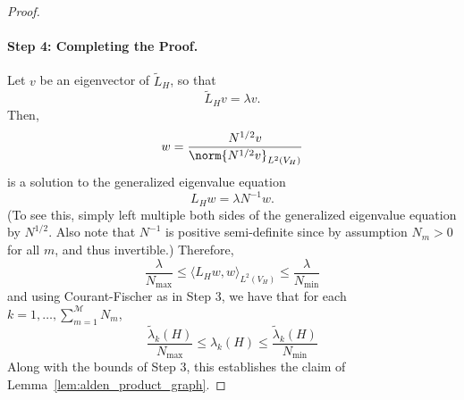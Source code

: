 \documentclass{article}
\newcommand{\1}{\mathbf{1}}
\newcommand{\dotp}[2]{\langle #1, #2 \rangle}
\newcommand{\wt}[1]{\widetilde{#1}}
\newcommand{\mc}[1]{\mathcal{#1}}
\theoremstyle{alden}
\theoremstyle{aldenthm}
\theoremstyle{definition}
\theoremstyle{remark}
\begin{document}
\begin{proof}
\paragraph{Step 4: Completing the Proof.}
Let $v$ be an eigenvector of $\wt{L}_H$, so that
\begin{equation*}
\wt{L}_H v = \lambda v.
\end{equation*}
Then, 
\begin{equation*}
w = \frac{N^{1/2}v}{\norm{N^{1/2}v}_{L^2(V_H)}}
\end{equation*}
is a solution to the generalized eigenvalue equation
\begin{equation*}
L_H w = \lambda N^{-1} w.
\end{equation*}
(To see this, simply left multiple both sides of the generalized eigenvalue equation by $N^{1/2}$. Also note that $N^{-1}$ is positive semi-definite since by assumption $N_m > 0$ for all $m$, and thus invertible.)  Therefore,
\begin{equation*}
\frac{\lambda}{N_{\max}} \leq \dotp{L_H w}{w}_{L^2(V_H)} \leq \frac{\lambda}{N_{\min}}
\end{equation*}
and using Courant-Fischer as in Step 3, we have that for each $k = 1,\ldots,\sum_{m = 1}^{\mc{M}} N_m$,
\begin{equation*}
\frac{\wt{\lambda}_k(H)}{N_{\max}} \leq \lambda_k(H) \leq \frac{\wt{\lambda}_k(H)}{N_{\min}}
\end{equation*}
Along with the bounds of Step 3, this establishes the claim of Lemma~\ref{lem:alden_product_graph}.

\end{proof}
\end{document}
